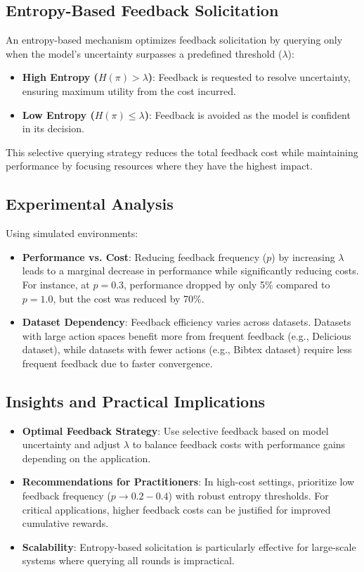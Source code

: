 \subsection{Entropy-Based Feedback Solicitation}

An entropy-based mechanism optimizes feedback solicitation by querying only when the model’s uncertainty surpasses a predefined threshold (\(\lambda\)):
\begin{itemize}
    \item \textbf{High Entropy (\(H(\pi) > \lambda\))}: Feedback is requested to resolve uncertainty, ensuring maximum utility from the cost incurred.
    \item \textbf{Low Entropy (\(H(\pi) \leq \lambda\))}: Feedback is avoided as the model is confident in its decision.
\end{itemize}

This selective querying strategy reduces the total feedback cost while maintaining performance by focusing resources where they have the highest impact.

\subsection{Experimental Analysis}

Using simulated environments:
\begin{itemize}
    \item \textbf{Performance vs. Cost}: Reducing feedback frequency (\(p\)) by increasing \(\lambda\) leads to a marginal decrease in performance while significantly reducing costs. For instance, at \(p = 0.3\), performance dropped by only 5\% compared to \(p = 1.0\), but the cost was reduced by 70\%.
    \item \textbf{Dataset Dependency}: Feedback efficiency varies across datasets. Datasets with large action spaces benefit more from frequent feedback (e.g., Delicious dataset), while datasets with fewer actions (e.g., Bibtex dataset) require less frequent feedback due to faster convergence.
\end{itemize}

\subsection{Insights and Practical Implications}

\begin{itemize}
    \item \textbf{Optimal Feedback Strategy}: Use selective feedback based on model uncertainty and adjust \(\lambda\) to balance feedback costs with performance gains depending on the application.
    \item \textbf{Recommendations for Practitioners}: In high-cost settings, prioritize low feedback frequency (\(p \to 0.2-0.4\)) with robust entropy thresholds. For critical applications, higher feedback costs can be justified for improved cumulative rewards.
    \item \textbf{Scalability}: Entropy-based solicitation is particularly effective for large-scale systems where querying all rounds is impractical.
\end{itemize}

